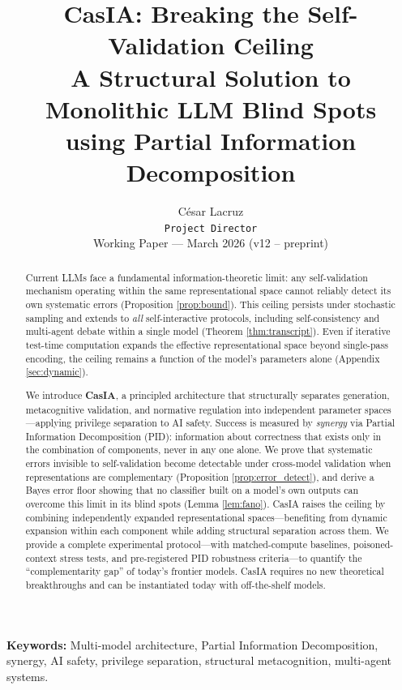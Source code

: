 \documentclass[11pt,a4paper]{article}
\title{%
  \textbf{CasIA: Breaking the Self-Validation Ceiling} \\[0.5em]
  \large A Structural Solution to Monolithic LLM Blind Spots \\
  using Partial Information Decomposition
}
\author{
  C\'esar Lacruz \\
  \texttt{Project Director} \\[0.3em]
  \small Working Paper --- March 2026 (v12 -- preprint)
}
\date{}
\theoremstyle{remark}
\begin{document}
\maketitle

\begin{abstract}
Current LLMs face a fundamental information-theoretic limit: any self-validation mechanism operating within the same representational space cannot reliably detect its own systematic errors (Proposition \ref{prop:bound}). This ceiling persists under stochastic sampling and extends to \emph{all} self-interactive protocols, including self-consistency and multi-agent debate within a single model (Theorem \ref{thm:transcript}). Even if iterative test-time computation expands the effective representational space beyond single-pass encoding, the ceiling remains a function of the model's parameters alone (Appendix \ref{sec:dynamic}).

We introduce \textbf{CasIA}, a principled architecture that structurally separates generation, metacognitive validation, and normative regulation into independent parameter spaces---applying privilege separation to AI safety. Success is measured by \emph{synergy} via Partial Information Decomposition (PID): information about correctness that exists only in the combination of components, never in any one alone. We prove that systematic errors invisible to self-validation become detectable under cross-model validation when representations are complementary (Proposition \ref{prop:error_detect}), and derive a Bayes error floor showing that no classifier built on a model's own outputs can overcome this limit in its blind spots (Lemma \ref{lem:fano}). CasIA raises the ceiling by combining independently expanded representational spaces---benefiting from dynamic expansion within each component while adding structural separation across them. We provide a complete experimental protocol---with matched-compute baselines, poisoned-context stress tests, and pre-registered PID robustness criteria---to quantify the ``complementarity gap'' of today's frontier models. CasIA requires no new theoretical breakthroughs and can be instantiated today with off-the-shelf models.
\end{abstract}

\vspace{0.5em}
\noindent\textbf{Keywords:} Multi-model architecture, Partial Information Decomposition, synergy, AI safety, privilege separation, structural metacognition, multi-agent systems.
\end{document}
